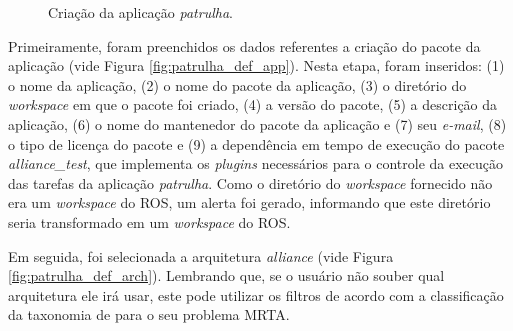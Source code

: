 \begin{figure}[htb]
                \caption{Criação da aplicação \textit{patrulha}.} \label{fig:patrulha_new_app}
            \end{figure}
            
            Primeiramente, foram preenchidos os dados referentes a criação do pacote da aplicação (vide Figura \ref{fig:patrulha_def_app}). Nesta etapa, foram inseridos: (1) o nome da aplicação, (2) o nome do pacote da aplicação, (3) o diretório do \textit{workspace} em que o pacote foi criado, (4) a versão do pacote, (5) a descrição da aplicação, (6) o nome do mantenedor do pacote da aplicação e (7) seu \textit{e-mail}, (8) o tipo de licença do pacote e (9) a dependência em tempo de execução do pacote \textit{alliance\_test}, que implementa os \textit{plugins} necessários para o controle da execução das tarefas da aplicação \textit{patrulha}. Como o diretório do \textit{workspace} fornecido não era um \textit{workspace} do ROS, um alerta foi gerado, informando que este diretório seria transformado em um \textit{workspace} do ROS.
            
            Em seguida, foi selecionada a arquitetura \textit{alliance} (vide Figura \ref{fig:patrulha_def_arch}). Lembrando que, se o usuário não souber qual arquitetura ele irá usar, este pode utilizar os filtros de acordo com a classificação da taxonomia de \cite{ref:gerkey2004taxonomy} para o seu problema MRTA. 
            
